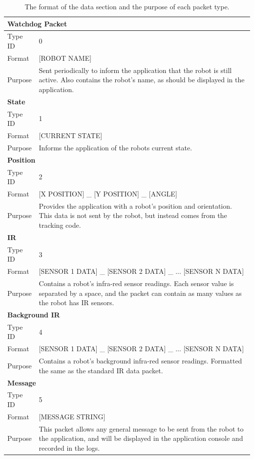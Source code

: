 \begin{longtable}{ l p{12cm} }
\caption[Data Format]{The format of the data section and the purpose of each packet type.}\\
 \hline
 \multicolumn{2}{p{12cm}}{\textbf{Watchdog Packet}}\\
 \hline
 Type ID & 0 \\
 Format & [ROBOT NAME]\\
 Purpose & Sent periodically to inform the application that the robot is still active. Also contains the robot's name, as should be displayed in the application.\\
 
 \hline
 \multicolumn{2}{p{12cm}}{\textbf{State}}\\
 \hline
 Type ID & 1 \\
 Format & [CURRENT STATE]\\
 Purpose & Informs the application of the robots current state.\\
 
 \hline
 \multicolumn{2}{p{12cm}}{\textbf{Position}}\\
 \hline
 Type ID & 2 \\
 Format & [X POSITION] \_ [Y POSITION] \_ [ANGLE]\\
 Purpose & Provides the application with a robot's position and orientation. This data is not sent by the robot, but instead comes from the tracking code.\\
 
 \hline
 \multicolumn{2}{p{12cm}}{\textbf{IR}}\\
 \hline
 Type ID & 3 \\
 Format & [SENSOR 1 DATA] \_ [SENSOR 2 DATA] \_ ... [SENSOR N DATA] \\
 Purpose & Contains a robot's infra-red sensor readings. Each sensor value is separated by a space, and the packet can contain as many values as the robot has IR sensors. \\
 
 \hline
 \multicolumn{2}{p{12cm}}{\textbf{Background IR}}\\
 \hline
 Type ID & 4 \\
 Format & [SENSOR 1 DATA] \_ [SENSOR 2 DATA] \_ ... [SENSOR N DATA] \\
 Purpose & Contains a robot's background infra-red sensor readings. Formatted the same as the standard IR data packet.\\
 
 \hline
 \multicolumn{2}{p{12cm}}{\textbf{Message}}\\
 \hline
 Type ID & 5 \\
 Format & [MESSAGE STRING]\\
 Purpose & This packet allows any general message to be sent from the robot to the application, and will be displayed in the application console and recorded in the logs. \\
 

\end{longtable}
